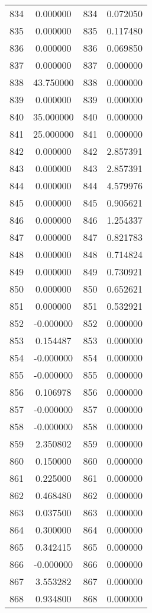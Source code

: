 \documentclass[12pt]{article}
\begin{document}
\begin{longtable}{@{}cccc@{}}
834 & 0.000000 & 834 & 0.072050 \\
835 & 0.000000 & 835 & 0.117480 \\
836 & 0.000000 & 836 & 0.069850 \\
837 & 0.000000 & 837 & 0.000000 \\
838 & 43.750000 & 838 & 0.000000 \\
839 & 0.000000 & 839 & 0.000000 \\
840 & 35.000000 & 840 & 0.000000 \\
841 & 25.000000 & 841 & 0.000000 \\
842 & 0.000000 & 842 & 2.857391 \\
843 & 0.000000 & 843 & 2.857391 \\
844 & 0.000000 & 844 & 4.579976 \\
845 & 0.000000 & 845 & 0.905621 \\
846 & 0.000000 & 846 & 1.254337 \\
847 & 0.000000 & 847 & 0.821783 \\
848 & 0.000000 & 848 & 0.714824 \\
849 & 0.000000 & 849 & 0.730921 \\
850 & 0.000000 & 850 & 0.652621 \\
851 & 0.000000 & 851 & 0.532921 \\
852 & -0.000000 & 852 & 0.000000 \\
853 & 0.154487 & 853 & 0.000000 \\
854 & -0.000000 & 854 & 0.000000 \\
855 & -0.000000 & 855 & 0.000000 \\
856 & 0.106978 & 856 & 0.000000 \\
857 & -0.000000 & 857 & 0.000000 \\
858 & -0.000000 & 858 & 0.000000 \\
859 & 2.350802 & 859 & 0.000000 \\
860 & 0.150000 & 860 & 0.000000 \\
861 & 0.225000 & 861 & 0.000000 \\
862 & 0.468480 & 862 & 0.000000 \\
863 & 0.037500 & 863 & 0.000000 \\
864 & 0.300000 & 864 & 0.000000 \\
865 & 0.342415 & 865 & 0.000000 \\
866 & -0.000000 & 866 & 0.000000 \\
867 & 3.553282 & 867 & 0.000000 \\
868 & 0.934800 & 868 & 0.000000 \\

\end{longtable}
\end{document}
